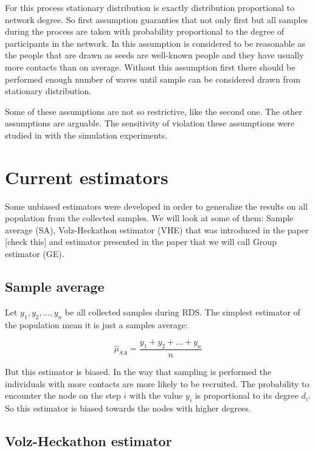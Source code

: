 \documentclass[12pt]{report}
\begin{document}
For this process stationary distribution is exactly distribution proportional to network degree. So first assumption guaranties that not only first but all samples during the process are taken with probability proportional to the degree of participants in the network. In \cite{salganik2004sampling} this assumption is considered to be reasonable as the people that are drawn as seeds are well-known people and they have usually more contacts than on average. Without this assumption first there should be performed enough number of waves until sample can be considered drawn from stationary distribution. 

Some of these assumptions are not so restrictive, like the second one. The other assumptions are arguable. The sensitivity of violation these assumptions were studied in \cite{gile2010respondent} with the simulation experiments. 


\section{Current estimators}

Some unbiased estimators were developed in order to generalize the results on all population from the collected samples. We will look at some of them: Sample average (SA), Volz-Heckathon estimator (VHE) that was introduced in the paper \cite{goel2010assessing}  [check this] and estimator presented in the paper \cite{salganik2004sampling} that we will call Group estimator (GE). 

\subsection{Sample average}

Let $y_1, y_2, ..., y_n$ be all collected samples during RDS. The simplest estimator of the population mean it is just a samples average:

$$ \widehat{\mu}_{SA} = \frac{y_1 + y_2 + ... + y_n}{n}$$

But this estimator is biased. In the way that sampling is performed the individuals with more contacts are more likely to be recruited. The probability to encounter the node on the step $i$ with the value $y_i$ is proportional to its degree $d_i$.
So this estimator is biased towards the nodes with higher degrees.

 
\subsection{Volz-Heckathon estimator}
\end{document}
